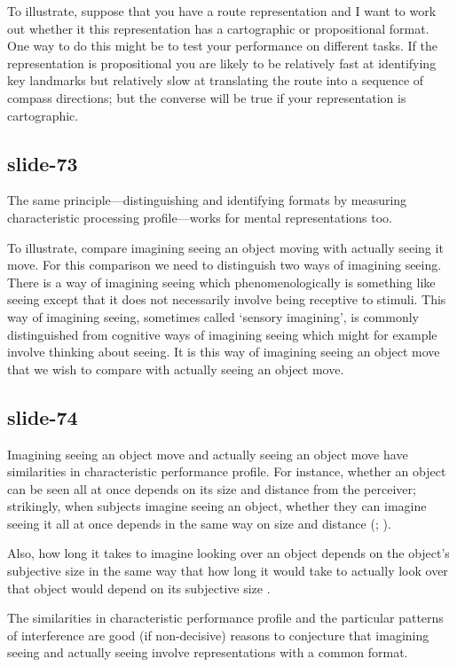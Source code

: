 \documentclass[12pt,\papersize]{extarticle}
\begin{document}
To illustrate, suppose that you have a route representation and I want to work out whether it this representation has a cartographic or propositional format.  One way to do this might be to test your performance on different tasks.  If the representation is propositional you are likely to be relatively fast at identifying key landmarks but relatively slow at translating the route into a sequence of compass directions; but the converse will be true if your representation is cartographic.

\subsection{slide-73}
The same principle---distinguishing and identifying formats by measuring characteristic processing profile---works for mental representations too.

To illustrate, compare imagining seeing an object moving with actually seeing it move.
For this comparison we need to distinguish two ways of imagining seeing. There is a way of
imagining seeing which phenomenologically is something like seeing except that it does not
necessarily involve being receptive to stimuli. This way of imagining seeing, sometimes
called `sensory imagining', is commonly distinguished from cognitive ways of imagining
seeing which might for example involve thinking about seeing.
It is this way of imagining seeing an object move that we wish to compare with actually
seeing an object move.

\subsection{slide-74}
Imagining seeing an object move and actually seeing an object move have similarities in characteristic performance profile.  For instance, whether an object can be seen all at once depends on its size and distance from the perceiver; strikingly, when subjects imagine seeing an object, whether they can imagine seeing it all at once depends in the same way on size and distance (\citealp{kosslyn:1978_measuring}; \citealp[p.\ 99ff]{kosslyn:1994_image}).

Also, how long it takes to imagine looking over an object depends on the object's subjective size in the same way that how long it would take to actually look over that object would depend on its subjective size \citep{kosslyn:1978_visual}.

The similarities in characteristic performance profile and the particular patterns of interference are good (if non-decisive) reasons to conjecture that imagining seeing and actually seeing involve representations with a common format.
\end{document}
